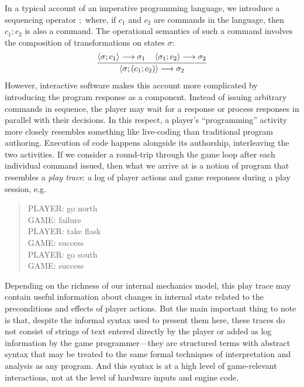     In a typical account of an imperative programming language, we
    introduce a sequencing operator $;$ where, if $c_1$ and $c_2$ are
    commands in the language, then $c_1;c_2$ is also a command.
    The operational semantics of such a command involves the
    composition of transformations on states $\sigma$:
    \[
      \infer{
        \left< \sigma; (c_1;c_2)\right> \longrightarrow
        \sigma_2
      }
      {
        \left<\sigma; c_1 \right> \longrightarrow
          \sigma_1
        \quad
        \left<\sigma_1; c_2 \right> \longrightarrow
          \sigma_2
      }
    \]
    However, interactive software makes this account more complicated by
    introducing the program response as a component. Instead of issuing
    arbitrary commands in sequence, the player may wait for a response or
    process responses in parallel with their decisions. In this respect, a
    player's ``programming'' activity more closely resembles something like
    live-coding than traditional program authoring. Execution of code
    happens alongside its authorship, interleaving the two activities. If
    we consider a round-trip through the game loop after each individual
    command issued, then what we arrive at is a notion of program that
    resembles a {\em play trace}: a log of player actions and game
    responses during a play session, e.g.
    \begin{quote}
      PLAYER: go north\\
      GAME: failure\\
      PLAYER: take flask\\
      GAME: success\\
      PLAYER: go south\\
      GAME: success
    \end{quote}
    Depending on the richness of our internal mechanics model, this play
    trace may contain useful information about changes in internal state
    related to the preconditions and effects of player actions. But the
    main important thing to note is that, despite the informal syntax used
    to present them here, these traces do not consist of strings of text
    entered directly by the player or added as log information by the game
    programmer---they are structured terms with abstract syntax that may be
    treated to the same formal techniques of interpretation and analysis as
    any program. And this syntax is at a high level of game-relevant
    interactions, not at the level of hardware inputs and engine code.

